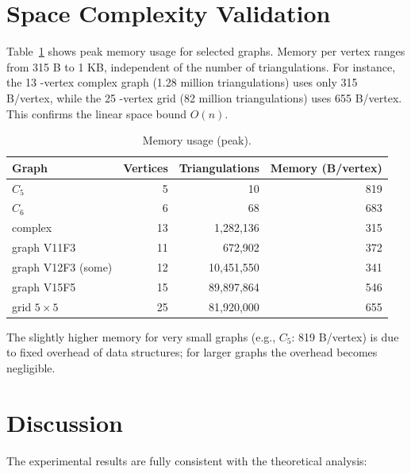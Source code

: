 \section{Space Complexity Validation}
\label{sec:space_validation}

Table~\ref{tab:memory} shows peak memory usage for selected graphs. 
Memory per vertex ranges from 315 B to 1 KB, independent of the number of triangulations. 
For instance, the 13 -vertex complex graph (1.28 million triangulations) uses only 315 B/vertex, while the 25 -vertex grid (82 million triangulations) uses 655 B/vertex. 
This confirms the linear space bound \(O(n)\).

\begin{table}[htbp]
    \centering
    \caption{Memory usage (peak).}
    \label{tab:memory}
    \begin{tabular}{|l|r|r|r|}
        \hline
        \textbf{Graph} & \textbf{Vertices} & \textbf{Triangulations} & \textbf{Memory (B/vertex)} \\
        \hline
        \(C_5\) & 5 & 10 & 819 \\
        \(C_6\) & 6 & 68 & 683 \\
        complex & 13 & 1,282,136 & 315 \\
        graph V11F3 & 11 & 672,902 & 372 \\
        graph V12F3 (some) & 12 & 10,451,550 & 341 \\
        graph V15F5 & 15 & 89,897,864 & 546 \\
        grid \(5\times5\) & 25 & 81,920,000 & 655 \\
        \hline
    \end{tabular}
\end{table}

The slightly higher memory for very small graphs (e.g., \(C_5\): 819 B/vertex) is due to fixed overhead of data structures; for larger graphs the overhead becomes negligible.

\section{Discussion}
\label{sec:discussion}

The experimental results are fully consistent with the theoretical analysis:

